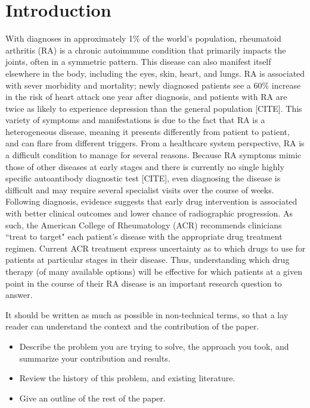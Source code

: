 \documentclass[10pt]{article}
\begin{document}
\section{Introduction}

With diagnoses in approximately 1\% of the world's population, rheumatoid arthritis (RA) is a chronic autoimmune condition that primarily impacts the joints, often in a symmetric pattern. This disease can also manifest itself elsewhere in the body, including the eyes, skin, heart, and lungs. RA is associated with sever morbidity and mortality; newly diagnosed patients see a 60\% increase in the risk of heart attack one year after diagnosis, and patients with RA are twice as likely to experience depression than the general population [CITE]. This variety of symptoms and manifestations is due to the fact that RA is a heterogeneous disease, meaning it presents differently from patient to patient, and can flare from different triggers. From a healthcare system perspective, RA is a difficult condition to manage for several reasons. Because RA symptoms mimic those of other diseases at early stages and there is currently no single highly specific autoantibody diagnostic test [CITE], even diagnosing the disease is difficult and may require several specialist visits over the course of weeks. Following diagnosis, evidence suggests that early drug intervention is associated with better clinical outcomes and lower chance of radiographic progression. As such, the American College of Rheumatology (ACR) recommends clinicians ``treat to target" each patient's disease with the appropriate drug treatment regimen. Current ACR treatment express uncertainty as to which drugs to use for patients at particular stages in their disease. Thus, understanding which drug therapy (of many available options) will be effective for which patients at a given point in the course of their RA disease is an important research question to answer.



It should be written as much as possible in non-technical terms, so that a
lay reader can understand the context and the contribution of the paper.

\begin{itemize}
\item Describe the problem you are trying to solve, the approach
you took, and summarize your contribution and results.

\item Review the history of this problem, and existing literature.

\item Give an outline of the rest of the paper.
\end{itemize}
\end{document}
